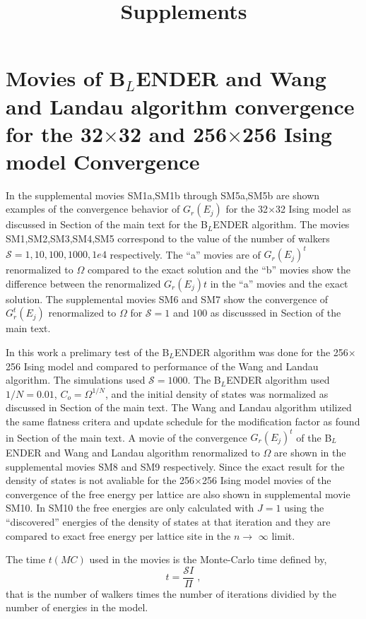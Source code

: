 \documentclass[a4paper,12pt]{article}
\title{Supplements}
\begin{document}
\newcommand{\RNum}[1]{\uppercase\expandafter{\romannumeral #1\relax}}
\section{Movies of B$_L$ENDER and Wang and Landau algorithm convergence for the 32$\times$32 and 256$\times$256 Ising model Convergence}
In the supplemental movies  SM1a,SM1b through SM5a,SM5b are shown examples of the convergence behavior of $G_r(E_j)$ for the 32$\times$32 Ising model as discussed in Section \RNum{2} of the main text for the B$_L$ENDER algorithm. The movies SM1,SM2,SM3,SM4,SM5 correspond to the value of the number of walkers $\mathcal{S}=1,10,100,1000,1e4$ respectively. The ``a'' movies are of $G_r(E_j)^t$ renormalized to $\Omega$ compared to the exact solution and the ``b'' movies show the difference between the renormalized $G_r(E_j)t$ in the ``a'' movies and the exact solution. The supplemental movies SM6 and SM7 show the convergence of $G_r^t(E_j)$ renormalized to $\Omega$ for $\mathcal{S}=1$ and $100$ as discusssed in Section \RNum{3} of the main text.

 In this work a prelimary test of the B$_L$ENDER algorithm was done for the 256$\times$256 Ising model and compared to performance of the Wang and Landau algorithm. The simulations used $\mathcal{S}=1000$. The B$_L$ENDER algorithm used $1/N=0.01$, $C_o = \Omega^{1/N}$, and the initial density of states was normalized as discussed in Section \RNum{2} of the main text. The Wang and Landau algorithm utilized the same flatness critera and update schedule for the modification factor as found in Section \RNum{3} of the main text. A movie of the convergence $G_r(E_j)^t$ of the B$_L$ENDER and Wang and Landau algorithm renormalized to $\Omega$ are shown in the supplemental movies SM8 and SM9 respectively.  Since the exact result for the density of states is not avaliable for the 256$\times$256 Ising model movies of the convergence of the free energy per lattice are also shown in supplemental movie SM10. In SM10 the free energies are only calculated with $J=1$ using the ``discovered'' energies of the density of states at that iteration and they are compared to exact free energy per lattice site in the $n\rightarrow$ $\infty$ limit. 
 
 The time $t(MC)$ used in the movies is the Monte-Carlo time defined by, 
\begin{equation}
t = \frac{\mathcal{S}I}{\Pi}\;,
\end{equation}
that is the number of walkers times the number of iterations dividied by the number of energies in the model. 
\end{document}
